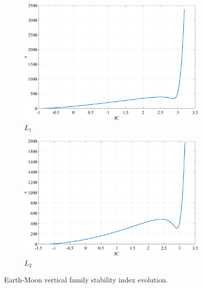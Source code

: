 \begin{figure}[ht]
    \begin{subfigure}[h]{0.4\linewidth}
        \includegraphics[width=\textwidth]{figures/L1VerticalStability.pdf}
        \caption{$L_{1}$}
    \end{subfigure}
    \hfill
    \begin{subfigure}[h]{0.4\linewidth}
        \includegraphics[width=\textwidth]{figures/L2VerticalStability.pdf}
        \caption{$L_{2}$}
    \end{subfigure}
    \caption{Earth-Moon vertical family stability index evolution.}
    \label{fig:verticalStability}
\end{figure}
